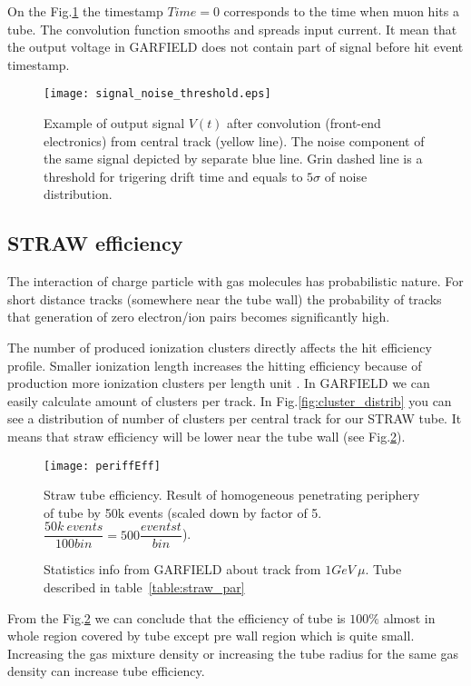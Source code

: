 	On the Fig.\ref{fig:signal_example} the timestamp $Time=0$ corresponds to the time when muon hits a tube. The convolution function smooths and spreads input current. It mean that the output voltage in GARFIELD does not contain part of signal before hit event timestamp.

	\begin{figure}[h!]
	\centering
	\texttt{[image: signal\_noise\_threshold.eps]}
	\caption{ Example of output signal $V(t)$ after convolution (front-end electronics) from central track (yellow line). The noise component of the same signal depicted by separate blue line. Grin dashed line is a threshold for trigering drift time and equals to $5\sigma$ of noise distribution.}
	\label{fig:signal_example}
	\end{figure}
	
	\subsection{ STRAW efficiency}
	
	The interaction of charge particle with gas molecules has probabilistic nature. For short distance tracks (somewhere near the tube wall) the probability of tracks that generation of zero electron/ion pairs becomes significantly high.
	
	The number of produced ionization clusters directly affects the hit efficiency profile. Smaller ionization length increases the hitting efficiency because of production more ionization clusters per length unit \cite{kozlinskiy}. In GARFIELD we can easily calculate amount of clusters per track. In Fig.\ref{fig:cluster_distrib} you can see a distribution of number of clusters per central track for our STRAW tube. It means that straw efficiency will be lower near the tube wall (see Fig.\ref{fig:efficiency}).
		

	\begin{figure}[h!]
	\centering
	\texttt{[image: periffEff]}
	
	\caption{Straw tube efficiency. Result of homogeneous penetrating periphery of tube by 50k events (scaled down by factor of 5. $\dfrac{50k~events}{100 bin}  = 500 \dfrac{eventst}{bin}$).}
	\label{fig:efficiency}
	\end{figure}	
	
	\begin{figure}[h!]
		\centering
		\qquad
			\caption{Statistics info from GARFIELD about track from $1GeV~\mu$. Tube described in table~\ref{table:straw_par}}
	\end{figure}
	
	From the Fig.\ref{fig:efficiency} we can conclude that the efficiency of tube is $100\%$ almost in whole region covered by tube except pre wall region which is quite small. Increasing the gas mixture density or increasing the tube radius for the same gas density can increase tube efficiency.